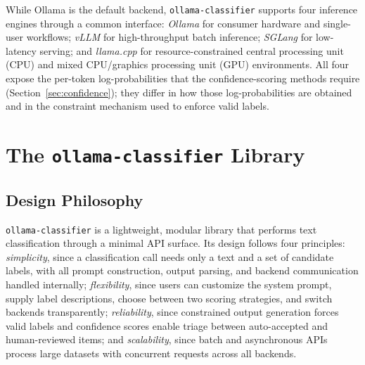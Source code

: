 \documentclass[11pt,a4paper]{article}
\begin{document}
While Ollama is the default backend, \texttt{ollama-classifier} supports four
inference engines through a common interface: \emph{Ollama} for consumer
hardware and single-user workflows; \emph{vLLM} for high-throughput batch
inference; \emph{SGLang} for low-latency serving; and \emph{llama.cpp} for
resource-constrained central processing unit (CPU) and mixed
CPU/graphics processing unit (GPU) environments. All four expose the
per-token log-probabilities that the confidence-scoring methods require
(Section~\ref{sec:confidence}); they differ in how those log-probabilities
are obtained and in the constraint mechanism used to enforce valid labels.



\section{The \texttt{ollama-classifier} Library}
\label{sec:library}

\subsection{Design Philosophy}

\texttt{ollama-classifier} is a lightweight, modular library that performs
text classification through a minimal API surface. Its design follows four
principles: \emph{simplicity}, since a classification call needs only a text
and a set of candidate labels, with all prompt construction, output parsing,
and backend communication handled internally; \emph{flexibility}, since users
can customize the system prompt, supply label descriptions, choose between
two scoring strategies, and switch backends transparently; \emph{reliability},
since constrained output generation forces valid labels and confidence scores
enable triage between auto-accepted and human-reviewed items; and
\emph{scalability}, since batch and asynchronous APIs process large datasets
with concurrent requests across all backends.
\end{document}
